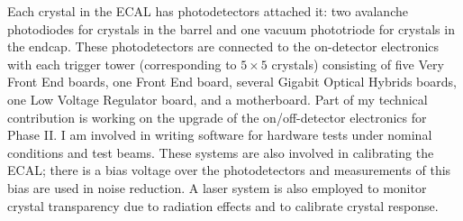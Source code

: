 \documentclass[12pt]{article}
\begin{document}
Each crystal in the ECAL has photodetectors attached it: two avalanche photodiodes for crystals in the barrel and one vacuum phototriode for crystals in the endcap. These photodetectors are connected to the on-detector electronics with each trigger tower (corresponding to $5 \times 5$ crystals) consisting of five Very Front End boards, one Front End board, several Gigabit Optical Hybrids boards, one Low Voltage Regulator board, and a motherboard. Part of my technical contribution is working on the upgrade of the on/off-detector electronics for Phase II. I am involved in writing software for hardware tests under nominal conditions and test beams. These systems are also involved in calibrating the ECAL; there is a bias voltage over the photodetectors and measurements of this bias are used in noise reduction. A laser system is also employed to monitor crystal transparency due to radiation effects and to calibrate crystal response.\par


\end{document}
